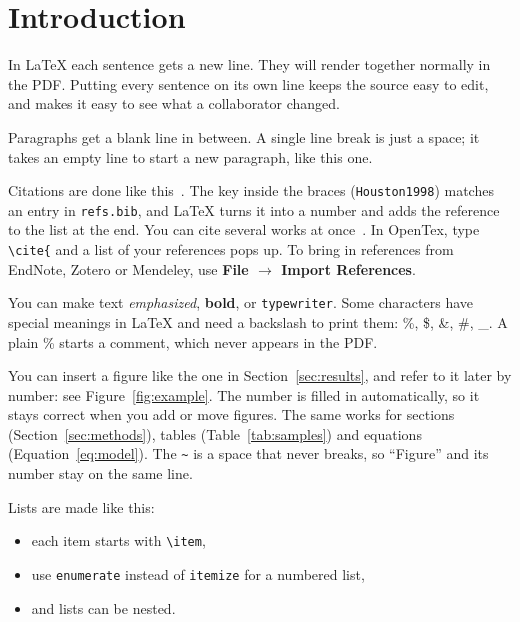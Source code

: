
\section{Introduction}
\label{sec:intro}

In \LaTeX{} each sentence gets a new line.
They will render together normally in the PDF.
Putting every sentence on its own line keeps the source easy to edit, and makes it easy to see what a collaborator changed.

Paragraphs get a blank line in between.
A single line break is just a space; it takes an empty line to start a new paragraph, like this one.

Citations are done like this~\cite{Houston1998}.
The key inside the braces (\texttt{Houston1998}) matches an entry in \texttt{refs.bib}, and \LaTeX{} turns it into a number and adds the reference to the list at the end.
You can cite several works at once~\cite{Knuth1984, Lamport1994}.
In OpenTex, type \verb|\cite{| and a list of your references pops up.
To bring in references from EndNote, Zotero or Mendeley, use \textbf{File $\rightarrow$ Import References}.

You can make text \emph{emphasized}, \textbf{bold}, or \texttt{typewriter}.
Some characters have special meanings in \LaTeX{} and need a backslash to print them: \%, \$, \&, \#, \_.
A plain \% starts a comment, which never appears in the PDF.

You can insert a figure like the one in Section~\ref{sec:results}, and refer to it later by number: see Figure~\ref{fig:example}.
The number is filled in automatically, so it stays correct when you add or move figures.
The same works for sections (Section~\ref{sec:methods}), tables (Table~\ref{tab:samples}) and equations (Equation~\ref{eq:model}).
The \verb|~| is a space that never breaks, so ``Figure'' and its number stay on the same line.

Lists are made like this:
\begin{itemize}
  \item each item starts with \verb|\item|,
  \item use \texttt{enumerate} instead of \texttt{itemize} for a numbered list,
  \item and lists can be nested.
\end{itemize}
